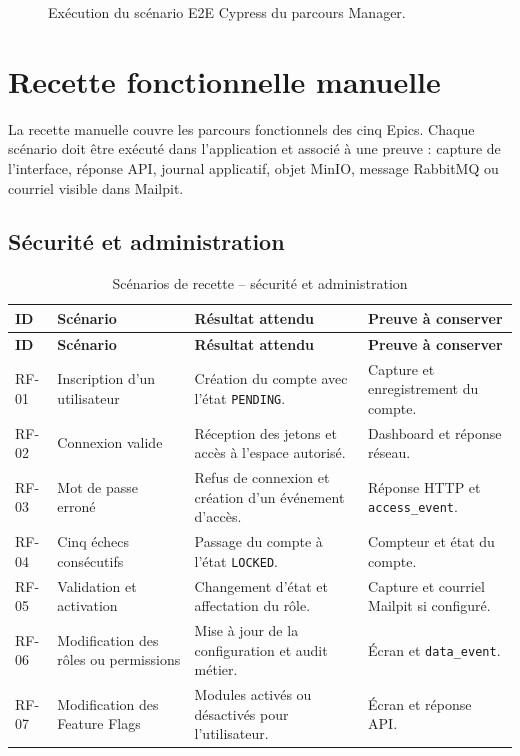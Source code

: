 \begin{figure}[H]
\centering
\vspace{5cm}
\caption{Exécution du scénario E2E Cypress du parcours Manager.}
\label{fig:cypress}
\end{figure}

\section{Recette fonctionnelle manuelle}

La recette manuelle couvre les parcours fonctionnels des cinq Epics. Chaque scénario doit être exécuté dans l'application et associé à une preuve : capture de l'interface, réponse API, journal applicatif, objet MinIO, message RabbitMQ ou courriel visible dans Mailpit.

\subsection{Sécurité et administration}

\begin{longtable}{p{1.5cm}p{4.2cm}p{5.3cm}p{3cm}}
\caption{Scénarios de recette -- sécurité et administration}
\label{tab:recette-securite} \\
\toprule
\textbf{ID} & \textbf{Scénario} & \textbf{Résultat attendu} & \textbf{Preuve à conserver} \\
\midrule
\endfirsthead
\toprule
\textbf{ID} & \textbf{Scénario} & \textbf{Résultat attendu} & \textbf{Preuve à conserver} \\
\midrule
\endhead
RF-01 & Inscription d'un utilisateur & Création du compte avec l'état \texttt{PENDING}. & Capture et enregistrement du compte. \\
RF-02 & Connexion valide & Réception des jetons et accès à l'espace autorisé. & Dashboard et réponse réseau. \\
RF-03 & Mot de passe erroné & Refus de connexion et création d'un événement d'accès. & Réponse HTTP et \texttt{access\_event}. \\
RF-04 & Cinq échecs consécutifs & Passage du compte à l'état \texttt{LOCKED}. & Compteur et état du compte. \\
RF-05 & Validation et activation & Changement d'état et affectation du rôle. & Capture et courriel Mailpit si configuré. \\
RF-06 & Modification des rôles ou permissions & Mise à jour de la configuration et audit métier. & Écran et \texttt{data\_event}. \\
RF-07 & Modification des Feature Flags & Modules activés ou désactivés pour l'utilisateur. & Écran et réponse API. \\
\bottomrule
\end{longtable}

